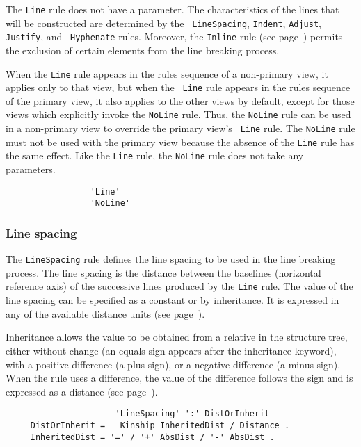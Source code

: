 The {\tt Line} rule does not have a parameter.  The characteristics of
the lines that will be constructed are determined by the {\tt
LineSpacing}, {\tt Indent}, {\tt Adjust}, {\tt Justify}, and {\tt
Hyphenate} rules.  Moreover, the {\tt Inline} rule (see
page~\pageref{regleinline}) permits the exclusion of certain elements
from the line breaking process.

When the {\tt Line} rule appears in the rules sequence of a
non-primary view, it applies only to that view, but when the {\tt
Line} rule appears in the rules sequence of the primary view, it also
applies to the other views by default, except for those views which
explicitly invoke the {\tt NoLine} rule.  Thus, the {\tt NoLine} rule
can be used in a non-primary view to override the primary view's {\tt
Line} rule.  The {\tt NoLine} rule must not be used with the primary
view because the absence of the {\tt Line} rule has the same effect.
Like the {\tt Line} rule, the {\tt NoLine} rule does not take any
parameters.

\begin{verbatim}
                 'Line'
                 'NoLine'
\end{verbatim}

\subsubsection{Line spacing}
\label{interligne}

The {\tt LineSpacing} rule defines the line spacing to be used in the
line breaking process.  The line spacing is the distance between the
baselines (horizontal reference axis) of the successive lines produced
by the {\tt Line} rule.  The value of the line spacing can be
specified as a constant or by inheritance.  It is expressed in any of
the available distance units (see page~\pageref{unites}).

Inheritance allows the value to be obtained from a relative in the
structure tree, either without change (an equals sign appears after
the inheritance keyword), with a positive difference (a plus sign), or
a negative difference (a minus sign).  When the rule uses a
difference, the value of the difference  follows the sign and is
expressed as a distance (see page~\pageref{unites}).

\begin{verbatim}
                      'LineSpacing' ':' DistOrInherit
     DistOrInherit =   Kinship InheritedDist / Distance .
     InheritedDist = '=' / '+' AbsDist / '-' AbsDist .
\end{verbatim}


